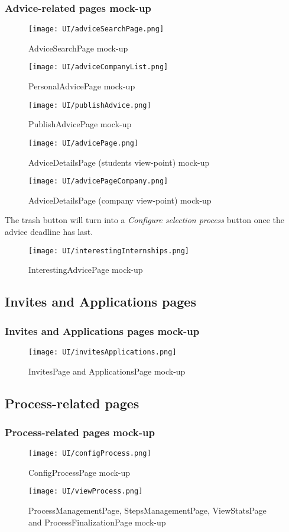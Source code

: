 	\subsubsection{Advice-related pages mock-up}
	\begin{figure}[H]
		\centering
		\caption{AdviceSearchPage mock-up}
		\texttt{[image: UI/adviceSearchPage.png]}
	\end{figure}
	\begin{figure}[H]
		\centering
		\caption{PersonalAdvicePage mock-up}
		\texttt{[image: UI/adviceCompanyList.png]}
	\end{figure}
	\begin{figure}[H]
		\centering
		\caption{PublishAdvicePage mock-up}
		\texttt{[image: UI/publishAdvice.png]}
	\end{figure}
	\begin{figure}[H]
		\centering
		\caption{AdviceDetailsPage (students view-point) mock-up}
		\texttt{[image: UI/advicePage.png]}
	\end{figure}
	\begin{figure}[H]
		\centering
		\caption{AdviceDetailsPage (company view-point) mock-up}
		\texttt{[image: UI/advicePageCompany.png]}
	\end{figure}
	The trash button will turn into a \emph{Configure selection process} button once the advice deadline has last.
	\begin{figure}[H]
		\centering
		\caption{InterestingAdvicePage mock-up}
		\texttt{[image: UI/interestingInternships.png]}
	\end{figure}
	\subsection{Invites and Applications pages}
	\subsubsection{Invites and Applications pages mock-up}
	\begin{figure}[H]
		\centering
		\caption{InvitesPage and ApplicationsPage mock-up}
		\texttt{[image: UI/invitesApplications.png]}
	\end{figure}
	\subsection{Process-related pages}
	\subsubsection{Process-related pages mock-up}
	\begin{figure}[H]
		\centering
		\caption{ConfigProcessPage mock-up}
		\texttt{[image: UI/configProcess.png]}
	\end{figure}
	\begin{figure}[H]
		\centering
		\caption{ProcessManagementPage, StepsManagementPage, ViewStatsPage and ProcessFinalizationPage mock-up}
		\texttt{[image: UI/viewProcess.png]}
	\end{figure}
